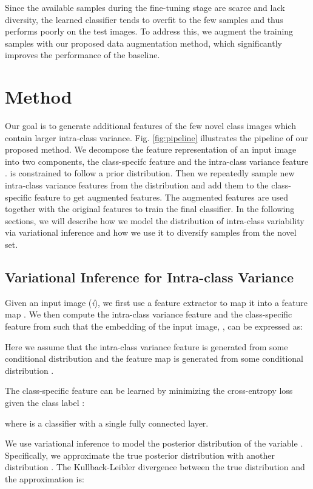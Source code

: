 \documentclass[10pt,twocolumn,letterpaper]{article}
\begin{document}
Since the available samples during the fine-tuning stage are scarce and lack diversity, the learned classifier tends to overfit to the few samples and thus performs poorly on the test images.
To address this, we augment the training samples with our proposed data augmentation method, which significantly improves the performance of the baseline.
   
\section{Method}
  Our goal is to generate additional features of the few novel class images which contain larger intra-class variance.
Fig. \ref{fig:pipeline} illustrates the pipeline of our proposed method.
We decompose the feature representation of an input image into two components, the class-specifc feature  and the intra-class variance feature .
 is constrained to follow a prior distribution.
Then we repeatedly sample new intra-class variance features   from the distribution and add them to the class-specific feature  to get augmented features.
The augmented features are used together with the original features to train the final classifier. In the following sections, we will describe how we model the distribution of intra-class variability via variational inference and how we use it to diversify samples from the novel set.
\subsection{Variational Inference for Intra-class Variance} \label{variational_infer_intra_variance}
      
      Given an input image (\textit{i}), we first use a feature extractor to map it into a feature map .
We then compute the intra-class variance feature   and the class-specific feature  from  such that the embedding of the input image, , can be expressed as:
      
Here we assume that the intra-class variance feature is generated from some conditional distribution  and the feature map  is generated from some conditional distribution .
      
      The class-specific feature  can be learned by minimizing the cross-entropy loss given the class label :

      where  is a classifier with a single fully connected layer. 



      We use variational inference to model the posterior distribution of the variable . Specifically, we approximate the true posterior distribution  with another distribution . The Kullback-Leibler divergence between the true distribution and the approximation is:
\end{document}
